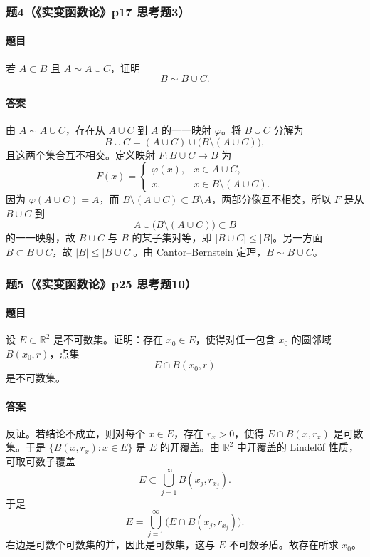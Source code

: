 \documentclass{article}
\newcommand{\R}{\mathbb{R}}
\begin{document}
\subsubsection*{题4（《实变函数论》p17 思考题3）}
\paragraph{题目}若 $A\subset B$ 且 $A\sim A\cup C$，证明
\[
B\sim B\cup C.
\]

\paragraph{答案}由 $A\sim A\cup C$，存在从 $A\cup C$ 到 $A$ 的一一映射 $\varphi$。将 $B\cup C$ 分解为
\[
B\cup C=(A\cup C)\cup\bigl(B\setminus(A\cup C)\bigr),
\]
且这两个集合互不相交。定义映射 $F:B\cup C\to B$ 为
\[
F(x)=
\begin{cases}
\varphi(x),&x\in A\cup C,\\
x,&x\in B\setminus(A\cup C).
\end{cases}
\]
因为 $\varphi(A\cup C)=A$，而 $B\setminus(A\cup C)\subset B\setminus A$，两部分像互不相交，所以 $F$ 是从 $B\cup C$ 到
\[
A\cup\bigl(B\setminus(A\cup C)\bigr)\subset B
\]
的一一映射，故 $B\cup C$ 与 $B$ 的某子集对等，即 $|B\cup C|\le |B|$。另一方面 $B\subset B\cup C$，故 $|B|\le |B\cup C|$。由 Cantor--Bernstein 定理，$B\sim B\cup C$。

\subsubsection*{题5（《实变函数论》p25 思考题10）}
\paragraph{题目}设 $E\subset\R^2$ 是不可数集。证明：存在 $x_0\in E$，使得对任一包含 $x_0$ 的圆邻域 $B(x_0,r)$，点集
\[
E\cap B(x_0,r)
\]
是不可数集。

\paragraph{答案}反证。若结论不成立，则对每个 $x\in E$，存在 $r_x>0$，使得 $E\cap B(x,r_x)$ 是可数集。于是 $\{B(x,r_x):x\in E\}$ 是 $E$ 的开覆盖。由 $\R^2$ 中开覆盖的 Lindelöf 性质，可取可数子覆盖
\[
E\subset\bigcup_{j=1}^{\infty}B(x_j,r_{x_j}).
\]
于是
\[
E=\bigcup_{j=1}^{\infty}\bigl(E\cap B(x_j,r_{x_j})\bigr).
\]
右边是可数个可数集的并，因此是可数集，这与 $E$ 不可数矛盾。故存在所求 $x_0$。
\end{document}
